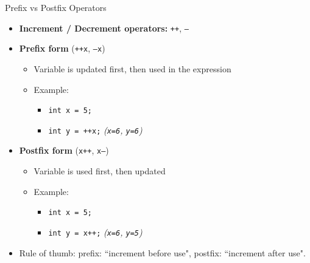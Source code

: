\documentclass[12pt, aspectratio=169]{beamer}
\begin{document}
    \begin{frame}{Prefix vs Postfix Operators}
        \begin{itemize}
            \item \textbf{Increment / Decrement operators:} \texttt{++}, \texttt{--}
            \item \textbf{Prefix form} (\texttt{++x}, \texttt{--x})
                \begin{itemize}
                    \item Variable is updated first, then used in the expression
                    \item Example: 
                        \begin{itemize}
                            \item \texttt{int x = 5;}
                            \item \texttt{int y = ++x;} \hfill \emph{(\texttt{x=6}, \texttt{y=6})}
                        \end{itemize}
                \end{itemize}
            \item \textbf{Postfix form} (\texttt{x++}, \texttt{x--})
                \begin{itemize}
                    \item Variable is used first, then updated
                    \item Example: 
                        \begin{itemize}
                            \item \texttt{int x = 5;}
                            \item \texttt{int y = x++;} \hfill \emph{(\texttt{x=6}, \texttt{y=5})}
                        \end{itemize}
                \end{itemize}
            \item Rule of thumb: prefix: ``increment before use", postfix: ``increment after use".
        \end{itemize}
    \end{frame}
\end{document}
